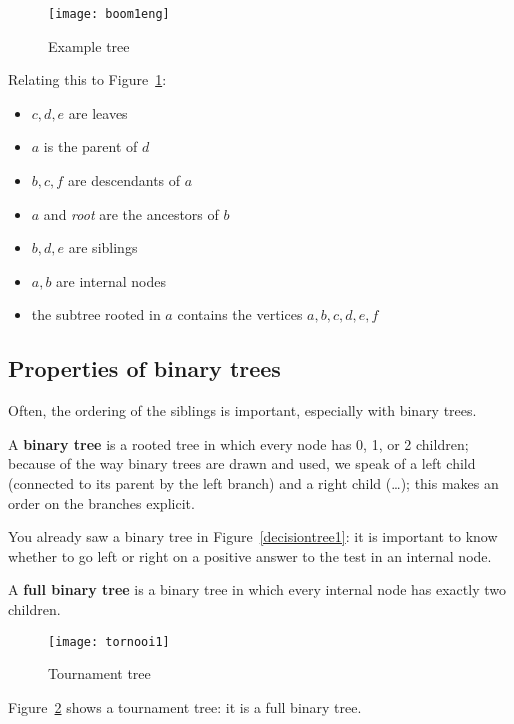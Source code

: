 \begin{figure}[ht]
	\centering
	\texttt{[image: boom1eng]}
	\caption{Example tree \label{boom1}}
\end{figure}
\newpage
Relating this to Figure~\ref{boom1}:

\begin{itemize}
	\item $c,d,e$ are leaves
	\item $a$ is the parent of $d$
	\item $b,c,f$ are descendants of $a$
	\item $a$ and {\em root} are the ancestors of $b$
	\item $b,d,e$ are siblings
	\item $a,b$ are internal nodes
	\item the subtree rooted in $a$ contains the vertices $a,b,c,d,e,f$
\end{itemize}

\subsection{Properties of binary trees}
Often, the ordering of the siblings is important, especially with binary
trees.

 \begin{definition}
\textup{A \textbf{binary tree} is a rooted tree in which every node
has 0, 1, or 2 children; because of the way binary trees are drawn and
used, we speak of a left child (connected to its parent by the left
branch) and a right child (\ldots); this makes an order on the branches
explicit.  }
\end{definition}

You already saw a binary tree in Figure~\ref{decisiontree1}: it is
important to know whether to go left or right on a positive answer to
the test in an internal node.

 \begin{definition}
\textup{A \textbf{full binary tree} is a binary tree
in which every internal node has exactly two children.  }
\end{definition}

\begin{figure}[ht]
	\centering
	\texttt{[image: tornooi1]}
	\caption{Tournament tree \label{tornooi1}}
\end{figure}


Figure~\ref{tornooi1} shows a tournament tree: it is a full binary tree.

